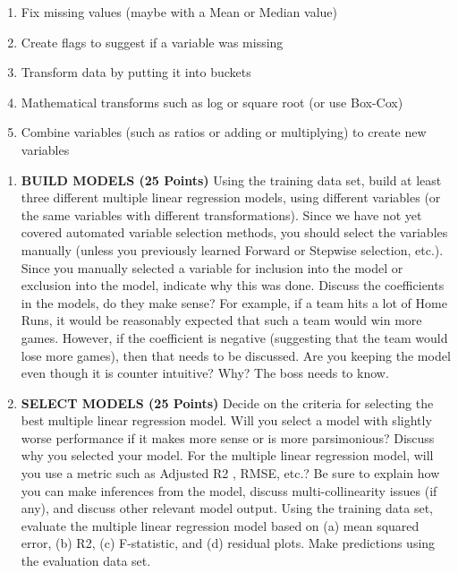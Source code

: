 \documentclass[
]{article}
\providecommand{\tightlist}{%
  \setlength{\itemsep}{0pt}\setlength{\parskip}{0pt}}
\begin{document}
\begin{enumerate}
\def\labelenumi{\alph{enumi}.}
\tightlist
\item
  Fix missing values (maybe with a Mean or Median value)
\item
  Create flags to suggest if a variable was missing
\item
  Transform data by putting it into buckets
\item
  Mathematical transforms such as log or square root (or use Box-Cox)
\item
  Combine variables (such as ratios or adding or multiplying) to create
  new variables
\end{enumerate}

\begin{enumerate}
\def\labelenumi{\arabic{enumi}.}
\setcounter{enumi}{2}
\tightlist
\item
  \textbf{BUILD MODELS (25 Points)} Using the training data set, build
  at least three different multiple linear regression models, using
  different variables (or the same variables with different
  transformations). Since we have not yet covered automated variable
  selection methods, you should select the variables manually (unless
  you previously learned Forward or Stepwise selection, etc.). Since you
  manually selected a variable for inclusion into the model or exclusion
  into the model, indicate why this was done. Discuss the coefficients
  in the models, do they make sense? For example, if a team hits a lot
  of Home Runs, it would be reasonably expected that such a team would
  win more games. However, if the coefficient is negative (suggesting
  that the team would lose more games), then that needs to be discussed.
  Are you keeping the model even though it is counter intuitive? Why?
  The boss needs to know.
\item
  \textbf{SELECT MODELS (25 Points)} Decide on the criteria for
  selecting the best multiple linear regression model. Will you select a
  model with slightly worse performance if it makes more sense or is
  more parsimonious? Discuss why you selected your model. For the
  multiple linear regression model, will you use a metric such as
  Adjusted R2 , RMSE, etc.? Be sure to explain how you can make
  inferences from the model, discuss multi-collinearity issues (if any),
  and discuss other relevant model output. Using the training data set,
  evaluate the multiple linear regression model based on (a) mean
  squared error, (b) R2, (c) F-statistic, and (d) residual plots. Make
  predictions using the evaluation data set.
\end{enumerate}
\end{document}
